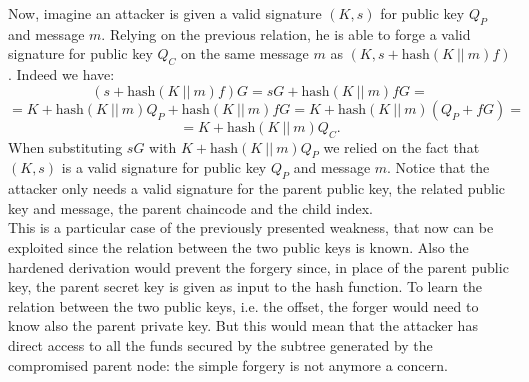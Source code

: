 \begin{figure}
	\noindent
	\label{fig:bip32}
\end{figure}
\noindent
Now, imagine an attacker is given a valid signature $(K, s)$ for public key $Q_P$ and message $m$. Relying on the previous relation, he is able to forge a valid signature for public key $Q_C$ on the same message $m$ as $(K, s + \text{hash}(K \ || \ m)f)$. Indeed we have:
$$(s + \text{hash}(K \ || \ m)f)G = sG + \text{hash}(K \ || \ m)fG = $$
$$= K + \text{hash}(K \ || \ m)Q_P + \text{hash}(K \ || \ m)fG = K + \text{hash}(K \ || \ m)(Q_P + fG) = $$
$$ = K + \text{hash}(K \ || \ m)Q_C.$$
When substituting $sG$ with $K + \text{hash}(K \ || \ m)Q_P$ we relied on the fact that $(K, s)$ is a valid signature for public key $Q_P$ and message $m$. Notice that the attacker only needs a valid signature for the parent public key, the related public key and message, the parent chaincode and the child index.
\\
This is a particular case of the previously presented weakness, that now can be exploited since the relation between the two public keys is known. Also the hardened derivation would prevent the forgery since, in place of the parent public key, the parent secret key is given as input to the hash function. To learn the relation between the two public keys, i.e. the offset, the forger would need to know also the parent private key. But this would mean that the attacker has direct access to all the funds secured by the subtree generated by the compromised parent node: the simple forgery is not anymore a concern.

